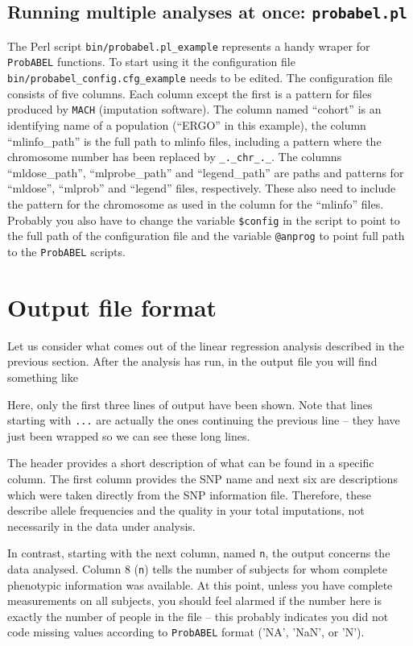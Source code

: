 \documentclass[12pt,a4paper]{article}
\begin{document}
\subsection{Running multiple analyses at once: \texttt{probabel.pl}}

The Perl script \texttt{bin/probabel.pl\_example} represents a handy
wraper for \texttt{ProbABEL} functions.  To start using it the
configuration file \texttt{bin/probabel\_config.cfg\_example} needs to
be edited. The configuration file consists of five columns. Each
column except the first is a pattern for files produced by
\texttt{MACH} (imputation software). The column named ``cohort'' is an
identifying name of a population (``ERGO'' in this example), the
column ``mlinfo\_path'' is the full path to mlinfo files, including a
pattern where the chromosome number has been replaced by
\texttt{\_.\_chr\_.\_}. The columns ``mldose\_path'',
``mlprobe\_path'' and ``legend\_path'' are paths and patterns for
``mldose'', ``mlprob'' and ``legend'' files, respectively. These also
need to include the pattern for the chromosome as used in the column
for the ``mlinfo'' files. Probably you also have to change the variable
\texttt{\$config} in the script to point to the full path of the
configuration file and the variable \texttt{@anprog} to point full
path to the \texttt{ProbABEL} scripts.


\section{Output file format}
Let us consider what comes out of the linear regression analysis
described in the previous section. After the analysis has run, in
the output file you will find something like
\begin{small}

\end{small}

Here, only the first three lines of output have been shown. Note that lines
starting with \texttt{...} are actually the ones continuing the
previous line -- they have just been wrapped so we can see
these long lines.

The header provides a short description of what can be found in a
specific column. The first column provides the SNP name and
next six are descriptions which were taken directly from the
SNP information file. Therefore, these describe allele frequencies and
the quality in your total imputations, not necessarily in the data under
analysis.

In contrast, starting with the next column, named \texttt{n},
the output concerns the data analysed. Column 8 (\texttt{n}) tells the
number of subjects for whom complete phenotypic information was available.
At this point, unless you have complete measurements on all
subjects, you should feel alarmed if the number here is exactly the
number of people in the file -- this probably indicates you did not code
missing values according to \texttt{ProbABEL} format ('NA', 'NaN', or 'N').
\end{document}
